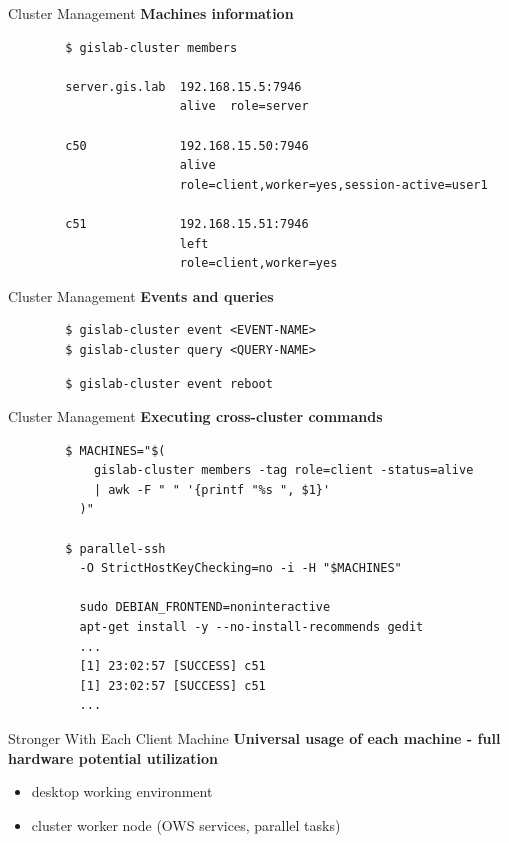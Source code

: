 \documentclass[12pt]{beamer}
\begin{document}
\begin{frame}[fragile]{Cluster Management}
	\textbf{Machines information}

	\lstset{language=sh}
	\begin{lstlisting}
		$ gislab-cluster members

		server.gis.lab  192.168.15.5:7946 
		                alive  role=server

		c50             192.168.15.50:7946
		                alive
		                role=client,worker=yes,session-active=user1

		c51             192.168.15.51:7946
		                left
		                role=client,worker=yes
	\end{lstlisting}
\end{frame}

\begin{frame}[fragile]{Cluster Management}
	\textbf{Events and queries}

	\lstset{language=sh}
	\begin{lstlisting}
		$ gislab-cluster event <EVENT-NAME>
		$ gislab-cluster query <QUERY-NAME>		
	\end{lstlisting}

	\lstset{language=sh}
	\begin{lstlisting}
		$ gislab-cluster event reboot
	\end{lstlisting}
\end{frame}

\begin{frame}[fragile]{Cluster Management}
	\textbf{Executing cross-cluster commands}

	\lstset{language=sh}
	\begin{lstlisting}
		$ MACHINES="$(
		    gislab-cluster members -tag role=client -status=alive
		    | awk -F " " '{printf "%s ", $1}'
		  )"

		$ parallel-ssh
		  -O StrictHostKeyChecking=no -i -H "$MACHINES"

		  sudo DEBIAN_FRONTEND=noninteractive
		  apt-get install -y --no-install-recommends gedit
		  ...
		  [1] 23:02:57 [SUCCESS] c51
		  [1] 23:02:57 [SUCCESS] c51
		  ...
	\end{lstlisting}
\end{frame}

\begin{frame}{Stronger With Each Client Machine}
	\textbf{Universal usage of each machine - full hardware potential utilization}
	\begin{itemize}
		\item desktop working environment
		\item cluster worker node (OWS services, parallel tasks)
	\end{itemize}
\end{frame}
\end{document}
